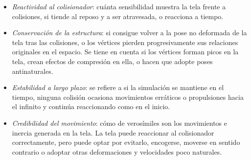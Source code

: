 \begin{itemize}
  \begin{itemize}
    \item \textit{Reactividad al colisionador}: cuánta sensibilidad muestra la tela frente a colisiones, si tiende al reposo y a ser atravesada, o reacciona a tiempo.
    \item \textit{Conservación de la estructura}: si consigue volver a la pose no deformada de la tela tras las colisiones, o los vértices pierden progresivamente sus relaciones originales en el espacio. Se tiene en cuenta si los vértices forman picos en la tela, crean efectos de compresión en ella, o hacen que adopte poses antinaturales.
    \item \textit{Estabilidad a largo plazo}: se refiere a si la simulación se mantiene en el tiempo, ninguna colisión ocasiona movimientos erráticos o propulsiones hacia el infinito y continúa reaccionando como en el inicio.
    \item \textit{Credibilidad del movimiento}: cómo de verosímiles son los movimientos e inercia generada en la tela. La tela puede reaccionar al colisionador correctamente, pero puede optar por evitarlo, encogerse, moverse en sentido contrario o adoptar otras deformaciones y velocidades poco naturales. 
  \end{itemize}

\end{itemize}
